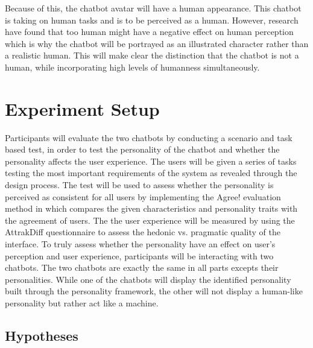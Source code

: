         Because of this, the chatbot avatar will have a human appearance. This chatbot is taking on human tasks and is to be perceived as a human. However, research have found that too human might have a negative effect on human perception which is why the chatbot will be portrayed as an illustrated character rather than a realistic human. This will make clear the distinction that the chatbot is not a human, while incorporating high levels of humanness simultaneously. 
    
\vspace{5mm} %
    
\section{Experiment Setup}
    
Participants will evaluate the two chatbots by conducting a scenario and task based test, in order to test the personality of the chatbot and whether the personality affects the user experience. The users will be given a series of tasks testing the most important requirements of the system as revealed through the design process. The test will be used to assess whether the personality is perceived as consistent for all users by implementing the Agree! evaluation method in which compares the given characteristics and personality traits with the agreement of users. The the user experience will be measured by using the AttrakDiff questionnaire to assess the hedonic vs. pragmatic quality of the interface. To truly assess whether the personality have an effect on user's perception and user experience, participants will be interacting with two chatbots. The two chatbots are exactly the same in all parts excepts their personalities. While one of the chatbots will display the identified personality built through the personality framework, the other will not display a human-like personality but rather act like a machine. %
    
\vspace{5mm} %

    \subsection{Hypotheses}
 
